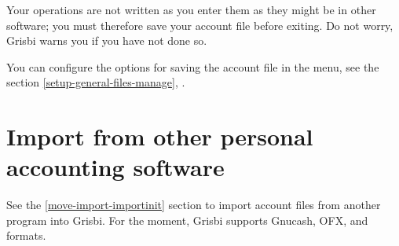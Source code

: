 Your operations are not written as you enter them as they might be in other software; you must therefore save your account file before exiting. Do not worry, Grisbi warns you if you have not done so.

You can configure the options for saving the account file in the   menu, see the section \vref{setup-general-files-manage}, .


\section{Import from other personal accounting software}

See the \vref{move-import-importinit} section to import account files from another program into Grisbi. For the moment, Grisbi supports \gls{Gnucash}, \gls{OFX},  and  formats.


